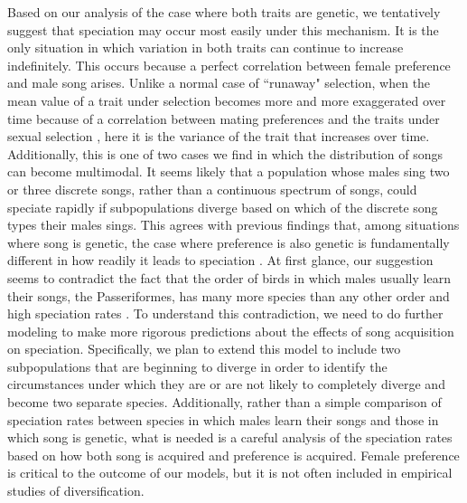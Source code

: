 \documentclass[12pt]{article}
\begin{document}
Based on our analysis of the case where both traits are genetic, we tentatively suggest that speciation may occur most easily under this mechanism. It is the only situation in which variation in both traits can continue to increase indefinitely. This occurs because a perfect correlation between female preference and male song arises. Unlike a normal case of ``runaway" selection, when the mean value of a trait under selection becomes more and more exaggerated over time because of a correlation between mating preferences and the traits under sexual selection \cite{Lande:1981fk,Doorn:2000nx,Aoki:2001ly,Mead:2004uq}, here it is the variance of the trait that increases over time. Additionally, this is one of two cases we find in which the distribution of songs can become multimodal. It seems likely that a population whose males sing two or three discrete songs, rather than a continuous spectrum of songs, could speciate rapidly if subpopulations diverge based on which of the discrete song types their males sings. This agrees with previous findings that, among situations where song is genetic, the case where preference is also genetic is fundamentally different in how readily it leads to speciation \cite{Verzijden:2005vn,Gilman:2015fk}. At first glance, our suggestion seems to contradict the fact that the order of birds in which males usually learn their songs, the Passeriformes, has many more species than any other order \cite{Wilkins:2012ve,Lachlan:2004tg} and high  speciation rates \cite{Jetz:2013fv}. To understand this contradiction, we need to do further modeling to make more rigorous predictions about the effects of song acquisition on speciation. Specifically, we plan to extend this model to include two subpopulations that are beginning to diverge in order to identify the circumstances under which they are or are not likely to completely diverge and become two separate species. Additionally, rather than a simple comparison of speciation rates between species in which males learn their songs and those in which song is genetic, what is needed is a careful analysis of the speciation rates based on how both song is acquired and preference is acquired. Female preference is critical to the outcome of our models, but it is not often included in empirical studies of diversification.
\end{document}
